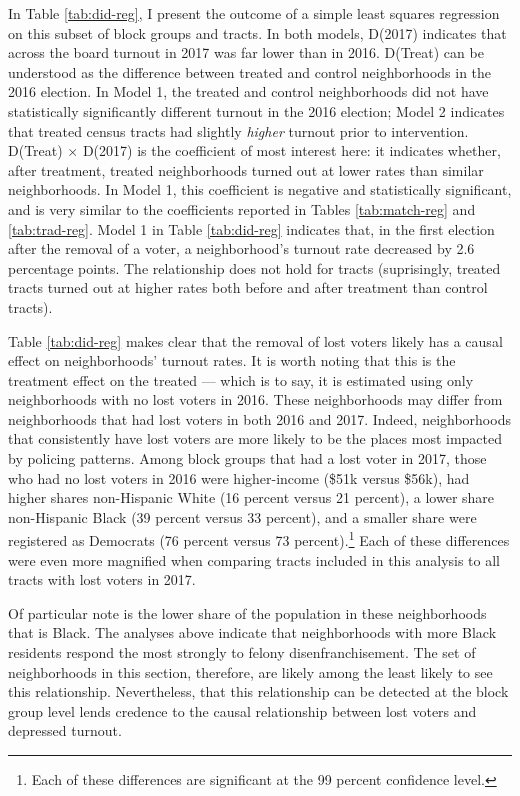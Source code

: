 \documentclass[12pt,]{article}
\let\rmarkdownfootnote\footnote%
\def\footnote{\protect\rmarkdownfootnote}
\begin{document}
In Table \ref{tab:did-reg}, I present the outcome of a simple least squares regression on this subset of block groups and tracts. In both models, D(2017) indicates that across the board turnout in 2017 was far lower than in 2016. D(Treat) can be understood as the difference between treated and control neighborhoods in the 2016 election. In Model 1, the treated and control neighborhoods did not have statistically significantly different turnout in the 2016 election; Model 2 indicates that treated census tracts had slightly \emph{higher} turnout prior to intervention. D(Treat) \(\times\) D(2017) is the coefficient of most interest here: it indicates whether, after treatment, treated neighborhoods turned out at lower rates than similar neighborhoods. In Model 1, this coefficient is negative and statistically significant, and is very similar to the coefficients reported in Tables \ref{tab:match-reg} and \ref{tab:trad-reg}. Model 1 in Table \ref{tab:did-reg} indicates that, in the first election after the removal of a voter, a neighborhood's turnout rate decreased by 2.6 percentage points. The relationship does not hold for tracts (suprisingly, treated tracts turned out at higher rates both before and after treatment than control tracts).



Table \ref{tab:did-reg} makes clear that the removal of lost voters likely has a causal effect on neighborhoods' turnout rates. It is worth noting that this is the treatment effect on the treated --- which is to say, it is estimated using only neighborhoods with no lost voters in 2016. These neighborhoods may differ from neighborhoods that had lost voters in both 2016 and 2017. Indeed, neighborhoods that consistently have lost voters are more likely to be the places most impacted by policing patterns. Among block groups that had a lost voter in 2017, those who had no lost voters in 2016 were higher-income (\$51k versus \$56k), had higher shares non-Hispanic White (16 percent versus 21 percent), a lower share non-Hispanic Black (39 percent versus 33 percent), and a smaller share were registered as Democrats (76 percent versus 73 percent).\footnote{Each of these differences are significant at the 99 percent confidence level.} Each of these differences were even more magnified when comparing tracts included in this analysis to all tracts with lost voters in 2017.

Of particular note is the lower share of the population in these neighborhoods that is Black. The analyses above indicate that neighborhoods with more Black residents respond the most strongly to felony disenfranchisement. The set of neighborhoods in this section, therefore, are likely among the least likely to see this relationship. Nevertheless, that this relationship can be detected at the block group level lends credence to the causal relationship between lost voters and depressed turnout.
\end{document}
